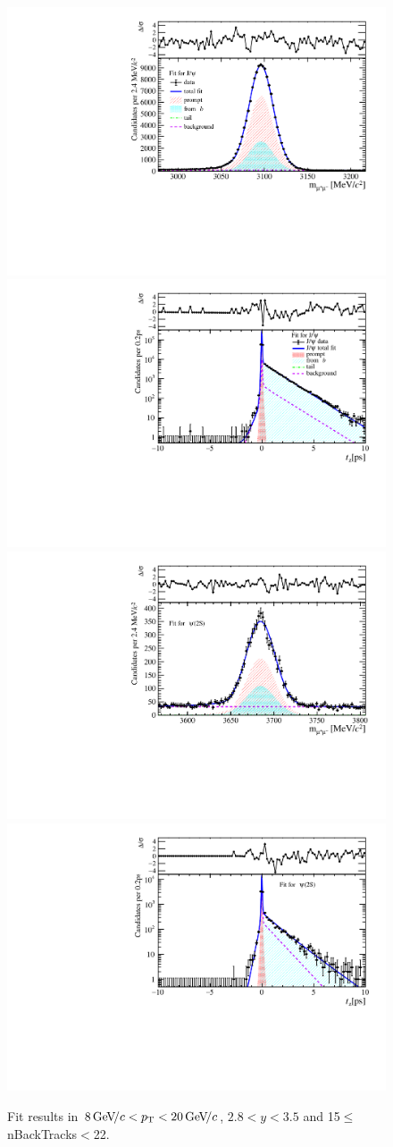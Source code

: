 \begin{figure}[H]
\begin{center}
\includegraphics[width=0.47\linewidth]{pdf/Jpsi/drawmassB/n3y2pt5.pdf}
\includegraphics[width=0.47\linewidth]{pdf/Jpsi/2DFitB/n3y2pt5.pdf}
\vspace*{-0.5cm}
\includegraphics[width=0.47\linewidth]{pdf/Psi2S/drawmassB/n3y2pt5.pdf}
\includegraphics[width=0.47\linewidth]{pdf/Psi2S/2DFitB/n3y2pt5.pdf}
\vspace*{-0.5cm}
\end{center}
\caption{Fit results in $8\text{\,Ge\kern -0.1em V\!/}c<p_{\mathrm{T}}<20\text{\,Ge\kern -0.1em V\!/}c$, $2.8<y<3.5$ and 15$\leq$nBackTracks$<$22.}
\label{Fitn3y2pt5}
\end{figure}

